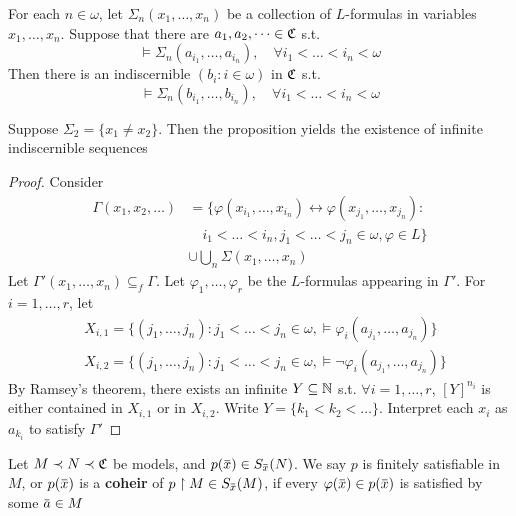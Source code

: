 \documentclass[11pt]{article}
\begin{document}
\begin{proposition}[]
For each \(n\in\omega\), let \(\Sigma_n(x_1,\dots,x_n)\) be a collection of \(L\)-formulas in
variables \(x_1,\dots,x_n\). Suppose that there are \(a_1,a_2,\dots\in\mathfrak{C}\) s.t.
\begin{equation*}
\vDash\Sigma_n(a_{i_1},\dots,a_{i_n}),\quad\forall i_1<\dots<i_n<\omega
\end{equation*}
Then there is an indiscernible \((b_i:i\in\omega)\) in \(\mathfrak{C}\) s.t.
\begin{equation*}
\vDash\Sigma_n(b_{i_1},\dots,b_{i_n}),\quad\forall i_1<\dots<i_n<\omega
\end{equation*}
\end{proposition}


\begin{examplle}[]
Suppose \(\Sigma_2=\{x_1\neq x_2\}\). Then the proposition yields the existence of infinite indiscernible sequences
\end{examplle}

\begin{proof}
Consider
\begin{align*}
\Gamma(x_1,x_2,\dots)&=\{\varphi(x_{i_1},\dots,x_{i_n})\leftrightarrow\varphi(x_{j_1},\dots,x_{j_n}):\\
&\quad i_1<\dots<i_n,j_1<\dots<j_n\in\omega,\varphi\in L\}\\
&\cup\bigcup_n\Sigma(x_1,\dots,x_n)
\end{align*}
Let \(\Gamma'(x_1,\dots,x_n)\subseteq_f\Gamma\). Let \(\varphi_1,\dots,\varphi_r\) be the \(L\)-formulas appearing in \(\Gamma'\).
For \(i=1,\dots,r\), let
\begin{align*}
&X_{i,1}=\{(j_1,\dots,j_n):j_1<\dots<j_n\in\omega,\vDash\varphi_i(a_{j_1},\dots,a_{j_n})\}\\
&X_{i,2}=\{(j_1,\dots,j_n):j_1<\dots<j_n\in\omega,\vDash\neg\varphi_i(a_{j_1},\dots,a_{j_n})\}
\end{align*}
By Ramsey's theorem, there exists an infinite \(Y\subseteq\mathbb{N}\) s.t. \(\forall i=1,\dots,r\), \([Y]^{n_i}\) is either
contained in \(X_{i,1}\) or in \(X_{i,2}\). Write \(Y=\{k_1<k_2<\dots\}\). Interpret each \(x_i\)
as \(a_{k_i}\) to satisfy \(\Gamma'\)
\end{proof}

\begin{definition}[]
Let \(M\prec N\prec\mathfrak{C}\) be models, and \(p(\barx)\in S_{\barx}(N)\). We say \(p\) is finitely satisfiable
in \(M\), or \(p(\barx)\) is a \textbf{coheir} of \(p\uhr M\in S_{\barx}(M)\), if
every \(\varphi(\barx)\in p(\barx)\) is satisfied by some \(\bara\in M\)
\end{definition}
\end{document}
